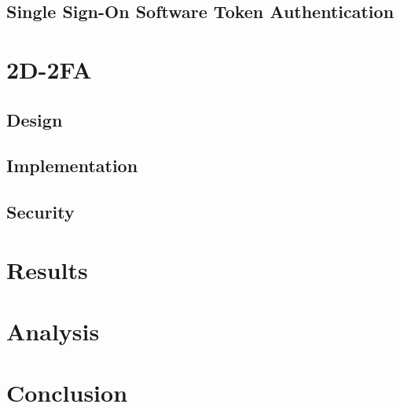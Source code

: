 \documentclass[11pt]{article} %
\begin{document}
\subsection{Single Sign-On Software Token Authentication}




\section{2D-2FA}



\subsection{Design}



\subsection{Implementation}



\subsection{Security}



\section{Results}



\section{Analysis}



\section{Conclusion}
\end{document}
